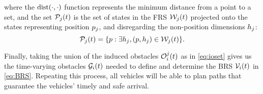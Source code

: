 \noindent where the $\text{dist}(\cdot, \cdot)$ function represents the minimum distance from a point to a set, and the set $\mathcal{P}_j(t)$ is the set of states in the FRS $\mathcal{W}_j(t)$ projected onto the states representing position $p_j$, and disregarding the non-position dimensions $h_j$:
\vspace{-0.4em}
\begin{equation}
\mathcal{P}_j(t) = \{p: \exists h_j, (p, h_j) \in \mathcal{W}_j(t)\}.
\end{equation}

Finally, taking the union of the induced obstacles $\mathcal{O}_i^j(t)$ as in \eqref{eq:ioset} gives us the time-varying obstacles $\mathcal{G}_i(t)$ needed to define and determine the BRS $\mathcal{V}_i(t)$ in \eqref{eq:BRS}. Repeating this process, all vehicles will be able to plan paths that guarantee the vehicles' timely and safe arrival.

